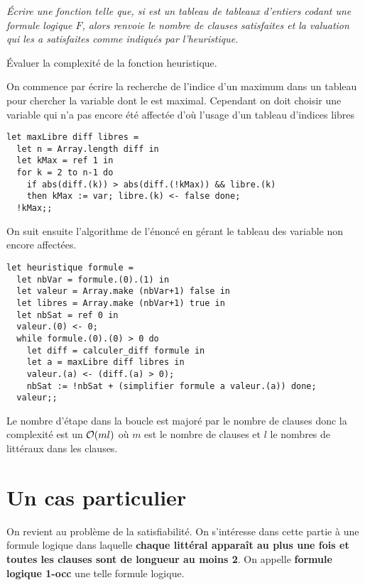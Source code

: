 \begin{Exercise}\it
Écrire une fonction  telle que, si  est un tableau de tableaux d’entiers codant une formule logique $F$, alors  renvoie le nombre  de clauses satisfaites et la valuation qui les a satisfaites comme indiqués par l'heuristique.

Évaluer la complexité de la fonction heuristique.
\end{Exercise}
\begin{Answer}
On commence par écrire la recherche de l'indice d'un maximum dans un tableau pour chercher la variable dont le  est maximal. Cependant on doit choisir une variable qui n'a pas encore été affectée d'où l'usage d'un tableau d'indices libres

\begin{lstlisting}
let maxLibre diff libres =
  let n = Array.length diff in
  let kMax = ref 1 in
  for k = 2 to n-1 do
    if abs(diff.(k)) > abs(diff.(!kMax)) && libre.(k)
    then kMax := var; libre.(k) <- false done;
  !kMax;;    
\end{lstlisting}

On suit ensuite l'algorithme de l'énoncé en gérant le tableau des variable non encore affectées.

\begin{lstlisting}
let heuristique formule = 
  let nbVar = formule.(0).(1) in 
  let valeur = Array.make (nbVar+1) false in
  let libres = Array.make (nbVar+1) true in
  let nbSat = ref 0 in
  valeur.(0) <- 0;
  while formule.(0).(0) > 0 do
    let diff = calculer_diff formule in
    let a = maxLibre diff libres in
    valeur.(a) <- (diff.(a) > 0);
    nbSat := !nbSat + (simplifier formule a valeur.(a)) done;
  valeur;;
\end{lstlisting}

Le nombre d'étape dans la boucle  est majoré par le nombre de clauses donc la complexité est un ${\cal O}(ml)$ où $m$ est le nombre de clauses et $l$ le nombres de littéraux dans les clauses.
\end{Answer}
\section{Un cas particulier}
On revient au problème de la satisfiabilité. On s’intéresse dans cette partie à une formule logique dans laquelle {\bf chaque littéral apparaît au plus une fois et toutes les clauses sont de longueur au moins 2}. On appelle {\bf formule logique 1-occ} une telle formule logique. 

